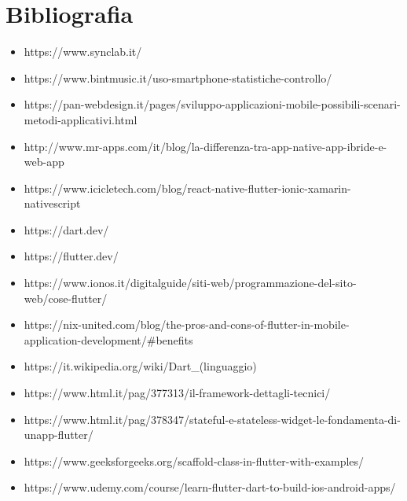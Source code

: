 

\cleardoublepage
\chapter{Bibliografia}

\nocite{*}
\printbibliography[heading=subbibliography,title={Riferimenti bibliografici},type=book]

\printbibliography[heading=subbibliography,title={Siti web consultati},type=online]
\begin{itemize}
\item https://www.synclab.it/

\item https://www.bintmusic.it/uso-smartphone-statistiche-controllo/

\item https://pan-webdesign.it/pages/sviluppo-applicazioni-mobile-possibili-scenari-metodi-applicativi.html

\item http://www.mr-apps.com/it/blog/la-differenza-tra-app-native-app-ibride-e-web-app

\item https://www.icicletech.com/blog/react-native-flutter-ionic-xamarin-nativescript

\item https://dart.dev/

\item https://flutter.dev/

\item https://www.ionos.it/digitalguide/siti-web/programmazione-del-sito-web/cose-flutter/

\item https://nix-united.com/blog/the-pros-and-cons-of-flutter-in-mobile-application-development/\#benefits

\item https://it.wikipedia.org/wiki/Dart\_(linguaggio)\\

\item https://www.html.it/pag/377313/il-framework-dettagli-tecnici/

\item https://www.html.it/pag/378347/stateful-e-stateless-widget-le-fondamenta-di-unapp-flutter/

\item https://www.geeksforgeeks.org/scaffold-class-in-flutter-with-examples/

\item https://www.udemy.com/course/learn-flutter-dart-to-build-ios-android-apps/

\end{itemize}







